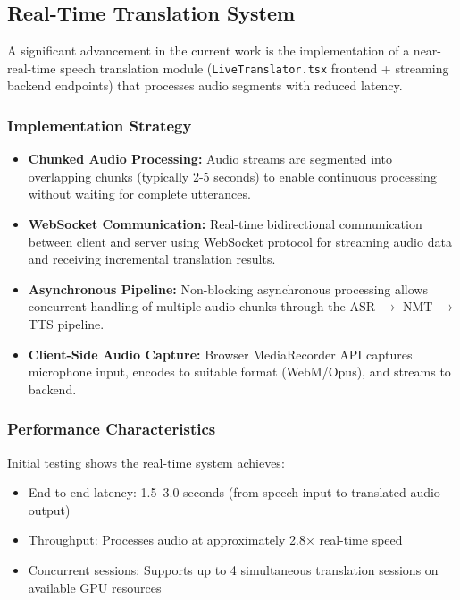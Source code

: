 \documentclass[12pt,oneside]{report}
\begin{document}
\subsection{Real-Time Translation System}

A significant advancement in the current work is the implementation of a near-real-time speech translation module (\texttt{LiveTranslator.tsx} frontend + streaming backend endpoints) that processes audio segments with reduced latency.

\subsubsection{Implementation Strategy}

\begin{itemize}
    \item \textbf{Chunked Audio Processing:} Audio streams are segmented into overlapping chunks (typically 2-5 seconds) to enable continuous processing without waiting for complete utterances.
    
    \item \textbf{WebSocket Communication:} Real-time bidirectional communication between client and server using WebSocket protocol for streaming audio data and receiving incremental translation results.
    
    \item \textbf{Asynchronous Pipeline:} Non-blocking asynchronous processing allows concurrent handling of multiple audio chunks through the ASR $\rightarrow$ NMT $\rightarrow$ TTS pipeline.
    
    \item \textbf{Client-Side Audio Capture:} Browser MediaRecorder API captures microphone input, encodes to suitable format (WebM/Opus), and streams to backend.
\end{itemize}

\subsubsection{Performance Characteristics}

Initial testing shows the real-time system achieves:
\begin{itemize}
    \item End-to-end latency: 1.5--3.0 seconds (from speech input to translated audio output)
    \item Throughput: Processes audio at approximately 2.8$\times$ real-time speed
    \item Concurrent sessions: Supports up to 4 simultaneous translation sessions on available GPU resources
\end{itemize}
\end{document}
